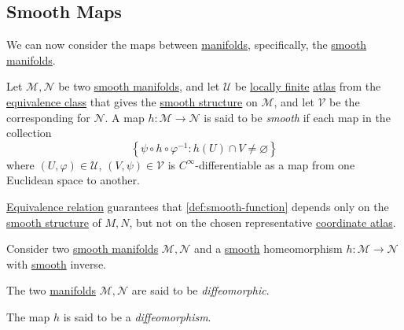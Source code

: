 \subsection{Smooth Maps}
We can now consider the maps between \hyperref[def:topological-manifold]{manifolds}, specifically, the \hyperref[def:smooth-manifold]{smooth manifolds}.

\begin{definition}\label{def:smooth-function}
	Let \(\mathcal{M} , \mathcal{N} \) be two \hyperref[def:smooth-manifold]{smooth manifolds}, and let \(\mathcal{U}\) be \hyperref[def:locally-finite]{locally finite} \hyperref[def:atlas]{atlas} from the \hyperref[def:equivalence-atlas]{equivalence class} that gives the \hyperref[def:smooth-structure]{smooth structure} on \(\mathcal{M} \), and let \(\mathcal{V}\) be the corresponding for \(\mathcal{N} \). A map \(h\colon \mathcal{M} \to \mathcal{N} \) is said to be \emph{smooth} if each map in the collection
	\[
		\left\{ \psi \circ h\circ \varphi ^{-1} \colon h(U) \cap V \neq \varnothing \right\}
	\]
	where \((U, \varphi )\in \mathcal{U} \), \((V, \psi )\in \mathcal{V} \) is \(C^{\infty} \)-differentiable as a map from one Euclidean space to another.
\end{definition}

\begin{center}
\end{center}

\begin{remark}
	\hyperref[def:equivalence-atlas]{Equivalence relation} guarantees that \autoref{def:smooth-function} depends only on the \hyperref[def:smooth-structure]{smooth structure} of \(M, N\), but not on the chosen representative \hyperref[def:atlas]{coordinate atlas}.
\end{remark}

\begin{definition*}
	Consider two \hyperref[def:smooth-manifold]{smooth manifolds} \(\mathcal{M} , \mathcal{N} \) and a \hyperref[def:smooth-function]{smooth} homeomorphism \(h\colon \mathcal{M} \to \mathcal{N} \) with \hyperref[def:smooth-function]{smooth} inverse.
	\begin{definition}[Diffeomorphic]\label{def:diffeomorphic}
		The two \hyperref[def:smooth-manifold]{manifolds} \(\mathcal{M} , \mathcal{N} \) are said to be \emph{diffeomorphic}.
	\end{definition}
	\begin{definition}[Diffeomorphism]\label{def:diffeomorphism}
		The map \(h\) is said to be a \emph{diffeomorphism}.
	\end{definition}
\end{definition*}

